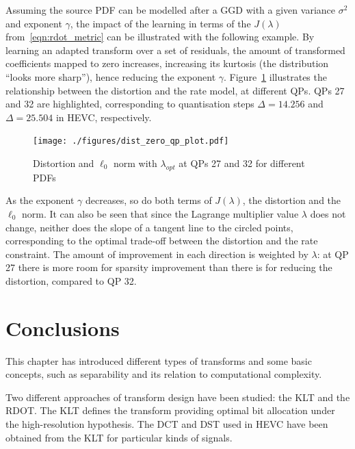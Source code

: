 \documentclass[11pt,a4paper,openright,twoside]{book}
\def\usepdfs{1} %
\numberwithin{equation}{section} %
\numberwithin{figure}{section} %
\numberwithin{table}{section} %
\begin{document}
Assuming the source \ac{PDF} can be modelled after a \ac{GGD} with a
given variance $\sigma^2$ and exponent $\gamma$, the impact of the
learning in terms of the $J(\lambda)$ from~\eqref{eqn:rdot_metric} can
be illustrated with the following example.
By learning an adapted transform over a set of residuals, the amount of
transformed coefficients mapped to zero increases, increasing its
kurtosis (the distribution ``looks more sharp''), hence reducing the
exponent $\gamma$.
Figure~\ref{fig:lambda_zero_norm_dist} illustrates the relationship
between the distortion and the rate model, at different \acp{QP}.
\acp{QP} 27 and 32 are highlighted, corresponding to quantisation steps
$\Delta = 14.256$ and $\Delta = 25.504$ in \ac{HEVC}, respectively.

\begin{figure}[tp]
	\centering
	\ifthenelse{\usepdfs = 0}
	{}
	{\texttt{[image: ./figures/dist\_zero\_qp\_plot.pdf]}}
	\caption{Distortion and $\ell_0$ norm with $\lambda_{opt}$ at
	\acsp{QP} 27 and 32 for different \acsp{PDF}}
	\label{fig:lambda_zero_norm_dist}
\end{figure}

As the exponent $\gamma$ decreases, so do both terms of $J(\lambda)$,
the distortion and the $\ell_0$ norm.
It can also be seen that since the Lagrange multiplier value $\lambda$
does not change, neither does the slope of a tangent line to the circled
points, corresponding to the optimal trade-off between the distortion
and the rate constraint.
The amount of improvement in each direction is weighted by $\lambda$: at
\ac{QP} 27 there is more room for sparsity improvement than there is for
reducing the distortion, compared to \ac{QP} 32.

\section{Conclusions}
\label{sec:conclusions_transforms}

This chapter has introduced different types of transforms and some
basic concepts, such as separability and its relation to computational
complexity.

Two different approaches of transform design have been studied:
the \ac{KLT} and the \ac{RDOT}.
The \ac{KLT} defines the transform providing optimal bit allocation under the
high-resolution hypothesis.
The \ac{DCT} and \ac{DST} used in \ac{HEVC} have been obtained from the
\ac{KLT} for particular kinds of signals.
\end{document}
